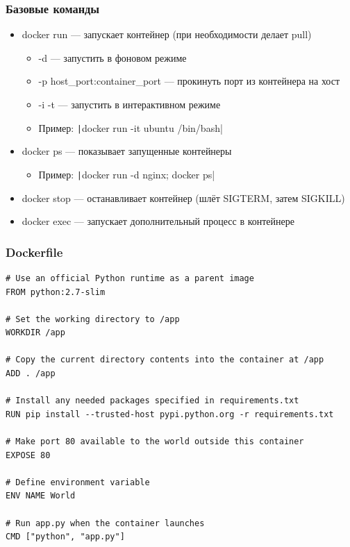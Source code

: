 \documentclass[xetex,mathserif,serif]{beamer}
\begin{document}
    \begin{frame}
        \frametitle{Базовые команды}
        \begin{itemize}
            \item docker run --- запускает контейнер (при необходимости делает pull)
            \begin{itemize}
                \item -d --- запустить в фоновом режиме
                \item -p host\_port:container\_port --- прокинуть порт из контейнера на хост
                \item -i -t --- запустить в интерактивном режиме
                \item Пример: \texttt|docker run -it ubuntu /bin/bash|
            \end{itemize}
            \item docker ps --- показывает запущенные контейнеры
            \begin{itemize}
                \item Пример: \texttt|docker run -d nginx; docker ps|
            \end{itemize}
            \item docker stop --- останавливает контейнер (шлёт SIGTERM, затем SIGKILL)
            \item docker exec --- запускает дополнительный процесс в контейнере
        \end{itemize}
    \end{frame}

    \begin{frame}[fragile]
        \frametitle{Dockerfile}
        \begin{scriptsize}
            \begin{verbatim}
# Use an official Python runtime as a parent image
FROM python:2.7-slim

# Set the working directory to /app
WORKDIR /app

# Copy the current directory contents into the container at /app
ADD . /app

# Install any needed packages specified in requirements.txt
RUN pip install --trusted-host pypi.python.org -r requirements.txt

# Make port 80 available to the world outside this container
EXPOSE 80

# Define environment variable
ENV NAME World

# Run app.py when the container launches
CMD ["python", "app.py"]
            \end{verbatim}
        \end{scriptsize}
    \end{frame}
\end{document}
